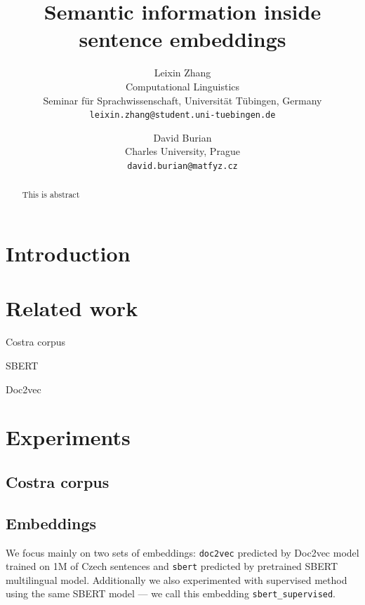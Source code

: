 \documentclass[11pt]{article}
\title{Semantic information inside sentence embeddings}
\author{Leixin Zhang \\ 
    Computational Linguistics\\
    Seminar für Sprachwissenschaft,
    Universität Tübingen, Germany \\ 
    \texttt{leixin.zhang@student.uni-tuebingen.de}
    }
\author{David Burian\\
  Charles University, Prague\\
  \texttt{david.burian@matfyz.cz}
  }
\newcommand{\Embed}[1]{\texttt{#1}}
\begin{document}
\maketitle

\begin{abstract}
This is abstract
\end{abstract}

\section{Introduction}


\section{Related work}

Costra corpus~\cite{baranvcikova2020costra}

SBERT~\cite{reimers2019sentence}

Doc2vec~\cite{le2014distributed}


\section{Experiments}

\subsection{Costra corpus}


\subsection{Embeddings}\label{sec:embeddings}

We focus mainly on two sets of embeddings: \Embed{doc2vec} predicted by Doc2vec
model trained on 1M of Czech sentences and \Embed{sbert} predicted by
pretrained SBERT multilingual model. Additionally we also experimented with
supervised method using the same SBERT model --- we call this embedding
\Embed{sbert\_supervised}.

\end{document}
